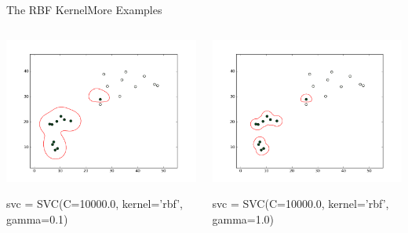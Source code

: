 \documentclass[xcolor=dvipsnames]{beamer}
\begin{document}
\begin{frame}{The RBF Kernel}{More Examples}
    \begin{columns}
        \begin{column}{0.5\textwidth}
            \begin{center}
                \includegraphics[width=\textwidth]{figs/gamma_1e-1.png}
            \end{center}
            svc = SVC(C=10000.0, kernel='rbf', gamma=0.1)
        \end{column}
        \begin{column}{0.5\textwidth}
            \begin{center}
                \includegraphics[width=\textwidth]{figs/gamma_1.png}
            \end{center}
            svc = SVC(C=10000.0, kernel='rbf', gamma=1.0)
        \end{column}
    \end{columns}
\end{frame}
\end{document}
